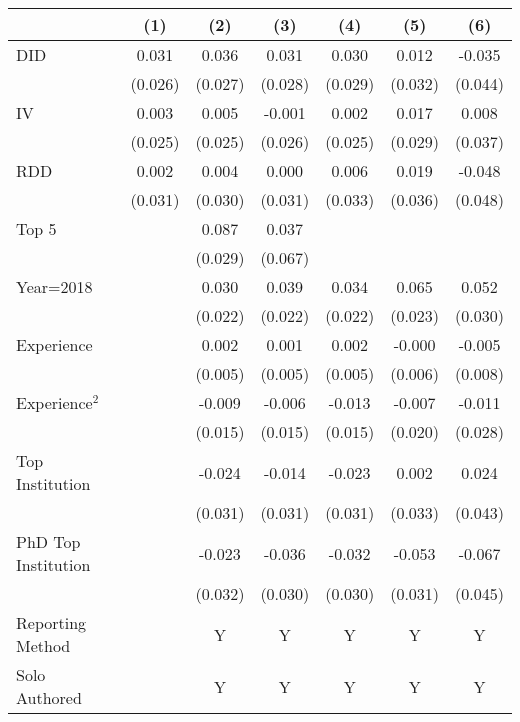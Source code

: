 \begin{tabular}{l*{6}{c}}
\hline\hline
                &\multicolumn{1}{c}{(1)}&\multicolumn{1}{c}{(2)}&\multicolumn{1}{c}{(3)}&\multicolumn{1}{c}{(4)}&\multicolumn{1}{c}{(5)}&\multicolumn{1}{c}{(6)}\\
\hline
DID             &    0.031&    0.036&    0.031&    0.030&    0.012&   -0.035\\
                &  (0.026)&  (0.027)&  (0.028)&  (0.029)&  (0.032)&  (0.044)\\
IV              &    0.003&    0.005&   -0.001&    0.002&    0.017&    0.008\\
                &  (0.025)&  (0.025)&  (0.026)&  (0.025)&  (0.029)&  (0.037)\\
RDD             &    0.002&    0.004&    0.000&    0.006&    0.019&   -0.048\\
                &  (0.031)&  (0.030)&  (0.031)&  (0.033)&  (0.036)&  (0.048)\\
Top 5           &         &    0.087&    0.037&         &         &         \\
                &         &  (0.029)&  (0.067)&         &         &         \\
Year=2018       &         &    0.030&    0.039&    0.034&    0.065&    0.052\\
                &         &  (0.022)&  (0.022)&  (0.022)&  (0.023)&  (0.030)\\
Experience      &         &    0.002&    0.001&    0.002&   -0.000&   -0.005\\
                &         &  (0.005)&  (0.005)&  (0.005)&  (0.006)&  (0.008)\\
Experience$^2$  &         &   -0.009&   -0.006&   -0.013&   -0.007&   -0.011\\
                &         &  (0.015)&  (0.015)&  (0.015)&  (0.020)&  (0.028)\\
Top Institution &         &   -0.024&   -0.014&   -0.023&    0.002&    0.024\\
                &         &  (0.031)&  (0.031)&  (0.031)&  (0.033)&  (0.043)\\
PhD Top Institution&         &   -0.023&   -0.036&   -0.032&   -0.053&   -0.067\\
                &         &  (0.032)&  (0.030)&  (0.030)&  (0.031)&  (0.045)\\
Reporting Method &         &        Y&        Y&        Y&        Y&        Y\\
Solo Authored   &         &        Y&        Y&        Y&        Y&        Y\\

\end{tabular}
